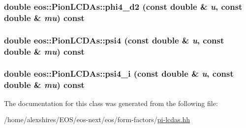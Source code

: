 \label{classeos_1_1PionLCDAs_acb4c831f65e2758d01263b7b4a121e7c}
\hypertarget{classeos_1_1PionLCDAs_ae2915f62dae4fe58776ff3367dff2ace}{
\subsubsection[{phi4\_\-d2}]{\setlength{\rightskip}{0pt plus 5cm}double eos::PionLCDAs::phi4\_\-d2 (const double \& {\em u}, \/  const double \& {\em mu}) const}}
\label{classeos_1_1PionLCDAs_ae2915f62dae4fe58776ff3367dff2ace}
\hypertarget{classeos_1_1PionLCDAs_ada2c4aa48e04c0f9de3511fd04333982}{
\subsubsection[{psi4}]{\setlength{\rightskip}{0pt plus 5cm}double eos::PionLCDAs::psi4 (const double \& {\em u}, \/  const double \& {\em mu}) const}}
\label{classeos_1_1PionLCDAs_ada2c4aa48e04c0f9de3511fd04333982}
\hypertarget{classeos_1_1PionLCDAs_aabea6be529b7aacdcccb10f3a8861a81}{
\subsubsection[{psi4\_\-i}]{\setlength{\rightskip}{0pt plus 5cm}double eos::PionLCDAs::psi4\_\-i (const double \& {\em u}, \/  const double \& {\em mu}) const}}
\label{classeos_1_1PionLCDAs_aabea6be529b7aacdcccb10f3a8861a81}


The documentation for this class was generated from the following file:\begin{DoxyCompactItemize}
\item 
/home/alexshires/EOS/eos-\/next/eos/form-\/factors/\hyperlink{pi-lcdas_8hh}{pi-\/lcdas.hh}\end{DoxyCompactItemize}
